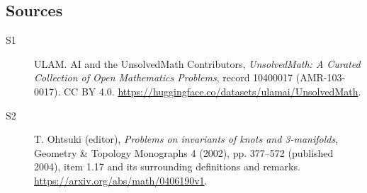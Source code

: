 \documentclass[11pt]{article}
\begin{document}
\subsection{Sources}
\begin{description}
\item[\hypertarget{source:10400017:1}{S1}] ULAM. AI and the UnsolvedMath Contributors, \emph{UnsolvedMath: A Curated Collection of Open Mathematics Problems}, record 10400017 (AMR-103-0017). CC BY 4.0. \url{https://huggingface.co/datasets/ulamai/UnsolvedMath}.
\item[\hypertarget{source:10400017:2}{S2}] T. Ohtsuki (editor), \emph{Problems on invariants of knots and 3-manifolds}, Geometry \& Topology Monographs 4 (2002), pp. 377--572 (published 2004), item 1.17 and its surrounding definitions and remarks. \url{https://arxiv.org/abs/math/0406190v1}.
\end{description}
\label{end:10400017}
\end{document}
